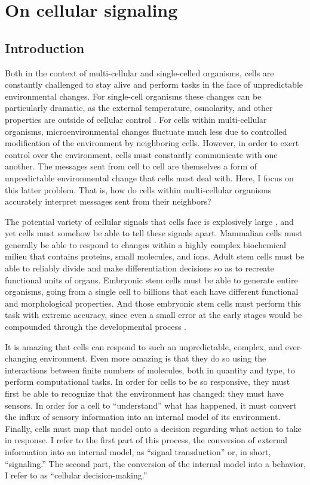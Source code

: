 \chapter{On cellular signaling}
\label{introduction:introduction}

\section{Introduction}

Both in the context of multi-cellular and single-celled
organisms, cells are constantly
challenged to stay alive and perform
tasks in the face of unpredictable environmental
changes. For single-cell organisms these changes
can be particularly dramatic, as the external temperature,
osmolarity, and other properties are outside of cellular
control \cite{Bennett2008,Acar2008}.
For cells within multi-cellular organisms,
microenvironmental changes fluctuate much less due to
controlled modification of the environment by neighboring
cells. However, in order to exert control over the environment,
cells must constantly communicate with one another. The
messages sent from cell to cell are themselves a form
of unpredictable environmental change that cells must deal with.
Here, I focus on this latter problem. That is, how do
cells within multi-cellular organisms accurately interpret
messages sent from their neighbors?


The potential variety of cellular signals that cells face
is explosively large \cite{Natarajan2006},
and yet cells must somehow be able to tell these signals apart.
Mammalian cells must generally be able to respond
to changes within a highly complex biochemical milieu that contains
proteins, small molecules, and ions.
Adult stem cells must be able to reliably
divide and make differentiation decisions so as to
recreate functional units of organs. Embryonic
stem cells must be able to generate entire organisms,
going from a single cell to billions that each have different
functional and morphological properties. And those embryonic stem cells must perform this
task with extreme accuracy, since even a small error at the early
stages would be compounded through the developmental process \cite{Balazsi2011}.


It is amazing that cells can respond to such an unpredictable, complex, and
ever-changing environment. Even more amazing is that they do so
using the interactions between finite numbers
of molecules, both in quantity and type, to perform computational tasks.
In order for cells to be so responsive, they must first be
able to recognize that the environment has changed: they must have
sensors. In order for a cell to ``understand'' what has happened,
it must convert the influx of
sensory information into an internal model of its environment.
Finally, cells must map that model
onto a decision regarding what action to take in response. I refer
to the first part of this process, the conversion of external
information into an internal model, as ``signal transduction'' or, in
short, ``signaling.'' The second
part, the conversion of the internal model into a behavior, I refer
to as ``cellular decision-making.''



